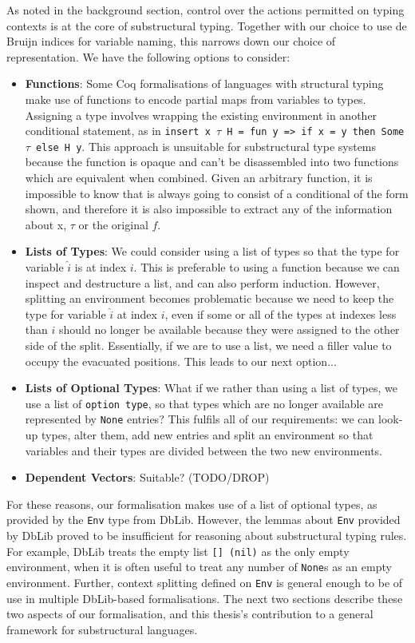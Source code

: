\documentclass[]{unswthesis}
\let\c\texttt
\begin{document}
As noted in the background section, control over the actions permitted on typing contexts is at the core of substructural typing. Together with our choice to use de Bruijn indices for variable naming, this narrows down our choice of representation. We have the following options to consider:

\begin{itemize}
\item \textbf{Functions}: Some Coq formalisations of languages with structural typing \cite{pierce15} make use of functions to encode partial maps from variables to types. Assigning a type involves wrapping the existing environment in another conditional statement, as in \c{insert x $\tau$ H = fun y => if x = y then Some $\tau$ else H y}. This approach is unsuitable for substructural type systems because the function is opaque and can't be disassembled into two functions which are equivalent when combined. Given an arbitrary function, it is impossible to know that is always going to consist of a conditional of the form shown, and therefore it is also impossible to extract any of the information about x, $\tau$ or the original $f$.
\item \textbf{Lists of Types}: We could consider using a list of types so that the type for variable $\hat{i}$ is at index $i$. This is preferable to using a function because we can inspect and destructure a list, and can also perform induction. However, splitting an environment becomes problematic because we need to keep the type for variable $\hat{i}$ at index $i$, even if some or all of the types at indexes less than $i$ should no longer be available because they were assigned to the other side of the split. Essentially, if we are to use a list, we need a filler value to occupy the evacuated positions. This leads to our next option...
\item \textbf{Lists of Optional Types}: What if we rather than using a list of types, we use a list of \c{option type}, so that types which are no longer available are represented by \c{None} entries? This fulfils all of our requirements: we can look-up types, alter them, add new entries and split an environment so that variables and their types are divided between the two new environments.
\item \textbf{Dependent Vectors}: Suitable? (TODO/DROP)
\end{itemize}

For these reasons, our formalisation makes use of a list of optional types, as provided by the \c{Env} type from DbLib. However, the lemmas about \c{Env} provided by DbLib proved to be insufficient for reasoning about substructural typing rules. For example, DbLib treats the empty list \c{[] (nil)} as the only empty environment, when it is often useful to treat any number of \c{None}s as an empty environment. Further, context splitting defined on \c{Env} is general enough to be of use in multiple DbLib-based formalisations. The next two sections describe these two aspects of our formalisation, and this thesis's contribution to a general framework for substructural languages.
\end{document}
